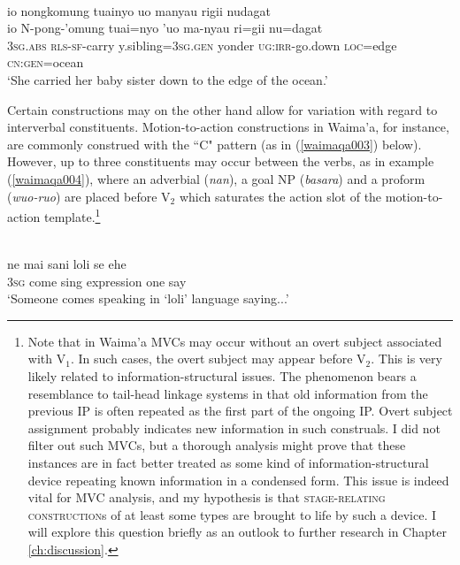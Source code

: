 \ea  \label{pendau016}
\\
\glll io nongkomung tuainyo uo manyau rigii nudagat \\
io N-pong-'omung tuai=nyo 'uo ma-nyau ri=gii nu=dagat \\
3\textsc{sg}.\textsc{abs} \textsc{rls}-\textsc{sf}-carry y.sibling=3\textsc{sg}.\textsc{gen} yonder \textsc{ug}:\textsc{irr}-go.down \textsc{loc}=edge \textsc{cn}:\textsc{gen}=ocean \\
\glft `She carried her baby sister down to the edge of the ocean.'\\
\z

Certain constructions may on the other hand allow for variation with regard to interverbal constituents. Motion-to-action constructions in Waima'a, for instance, are commonly construed with the ``C" pattern (as in (\ref{waimaqa003}) below). However, up to three constituents may occur between the verbs, as in example (\ref{waimaqa004}), where an adverbial (\textit{nan}), a goal NP (\textit{basara}) and a proform (\textit{wuo-ruo}) are placed before V$_2$ which saturates the action slot of the motion-to-action template.\footnote{Note that in Waima'a MVCs may occur without an overt subject associated with V$_1$. In such cases, the overt subject may appear before V$_2$. This is very likely related to information-structural issues. The phenomenon bears a resemblance to tail-head linkage systems in that old information from the previous IP is often repeated as the first part of the ongoing IP. Overt subject assignment probably indicates new information in such construals. I did not filter out such MVCs, but a thorough analysis might prove that these instances are in fact better treated as some kind of information-structural device repeating known information in a condensed form. This issue is indeed vital for MVC analysis, and my hypothesis is that \textsc{stage-relating construction}s of at least some types are brought to life by such a device. I will explore this question briefly as an outlook to further research in Chapter \ref{ch:discussion}.}

\ea \label{waimaqa003}
\\
\gll ne mai sani loli se ehe \\
3\textsc{sg} come sing expression one say \\
\glft `Someone comes speaking in `loli' language saying...'\\ 
\z


